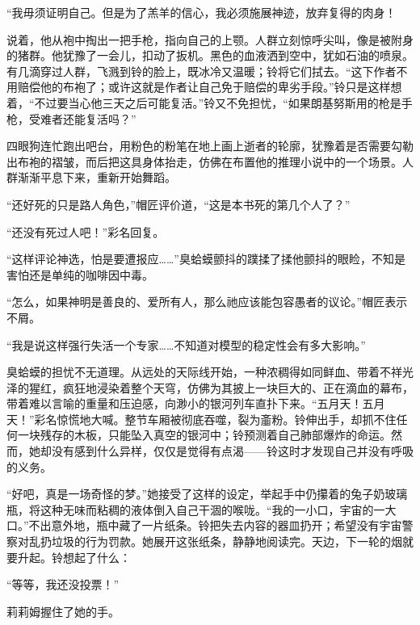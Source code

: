 “我毋须证明自己。但是为了羔羊的信心，我必须施展神迹，放弃复得的肉身！

说着，他从袍中掏出一把手枪，指向自己的上颚。人群立刻惊呼尖叫，像是被附身的猪群。他犹豫了一会儿，扣动了扳机。黑色的血液洒到空中，犹如石油的喷泉。有几滴穿过人群，飞溅到铃的脸上，既冰冷又温暖；铃将它们拭去。“这下作者不用赔偿他的布袍了；或许这就是作者让自己免于赔偿的卑劣手段。”铃只是这样想着，“不过要当心他三天之后可能复活。”铃又不免担忧，“如果朗基努斯用的枪是手枪，受难者还能复活吗？”

四眼狗连忙跑出吧台，用粉色的粉笔在地上画上逝者的轮廓，犹豫着是否需要勾勒出布袍的褶皱，而后把这具身体抬走，仿佛在布置他的推理小说中的一个场景。人群渐渐平息下来，重新开始舞蹈。

“还好死的只是路人角色，”帽匠评价道，“这是本书死的第几个人了？”

“还没有死过人吧！”彩名回复。

“这样评论神选，怕是要遭报应……”臭蛤蟆颤抖的蹼揉了揉他颤抖的眼睑，不知是害怕还是单纯的咖啡因中毒。

“怎么，如果神明是善良的、爱所有人，那么祂应该能包容愚者的议论。”帽匠表示不屑。

“我是说这样强行失活一个专家……不知道对模型的稳定性会有多大影响。”

臭蛤蟆的担忧不无道理。从远处的天际线开始，一种浓稠得如同鲜血、带着不祥光泽的猩红，疯狂地浸染着整个天穹，仿佛为其披上一块巨大的、正在滴血的幕布，带着难以言喻的重量和压迫感，向渺小的银河列车直扑下来。“五月天！五月天！”彩名惊慌地大喊。整节车厢被彻底吞噬，裂为齑粉。铃伸出手，却抓不住任何一块残存的木板，只能坠入真空的银河中；铃预测着自己肺部爆炸的命运。然而，她却没有感到什么异样，仅仅是觉得有点渴——铃这时才发现自己并没有呼吸的义务。

“好吧，真是一场奇怪的梦。”她接受了这样的设定，举起手中仍攥着的兔子奶玻璃瓶，将这种无味而粘稠的液体倒入自己干涸的喉咙。“我的一小口，宇宙的一大口。”不出意外地，瓶中藏了一片纸条。铃把失去内容的器皿扔开；希望没有宇宙警察对乱扔垃圾的行为罚款。她展开这张纸条，静静地阅读完。天边，下一轮的烟就要升起。铃想起了什么：

“等等，我还没投票！”

莉莉姆握住了她的手。

